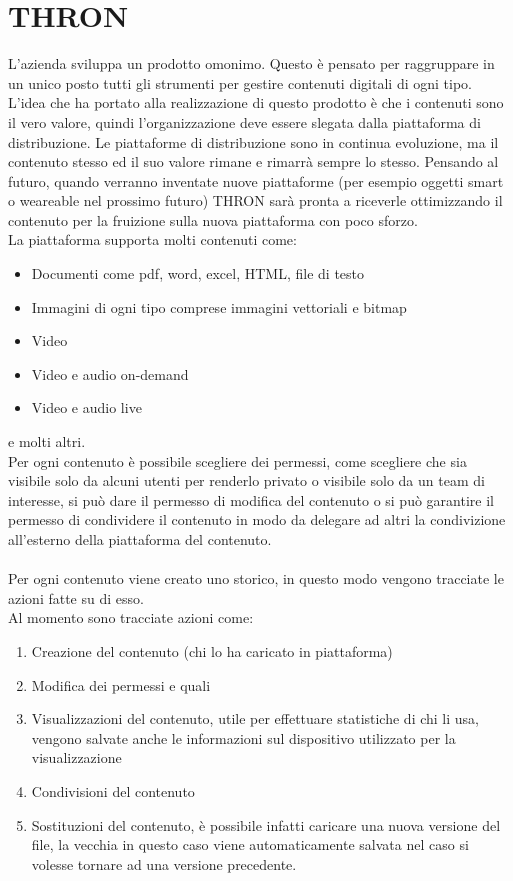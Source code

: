 \documentclass[a4paper, 12pt, twoside, openright]{book}
\begin{document}
\newpage{}
\section{THRON}
L'azienda sviluppa un prodotto omonimo. Questo è pensato per raggruppare in un unico posto tutti gli strumenti per gestire contenuti digitali di ogni tipo.\\
L'idea che ha portato alla realizzazione di questo prodotto è che i contenuti sono il vero valore, quindi l'organizzazione deve essere slegata dalla piattaforma di distribuzione. Le piattaforme di distribuzione sono in continua evoluzione, ma il contenuto stesso ed il suo valore rimane e rimarrà sempre lo stesso. Pensando al futuro, quando verranno inventate nuove piattaforme (per esempio oggetti smart o weareable nel prossimo futuro) THRON sarà pronta a riceverle ottimizzando il contenuto per la fruizione sulla nuova piattaforma con poco sforzo.\\
La piattaforma supporta molti contenuti come:
\begin{itemize}
\item Documenti come pdf, word, excel, HTML, file di testo
\item Immagini di ogni tipo comprese immagini vettoriali e bitmap
\item Video
\item Video e audio on-demand
\item Video e audio live
\end{itemize}
e molti altri.\\
Per ogni contenuto è possibile scegliere dei permessi, come scegliere che sia visibile solo da alcuni utenti per renderlo privato o visibile solo da un team di interesse, si può dare il permesso di modifica del contenuto o si può garantire il permesso di condividere il contenuto in modo da delegare ad altri la condivizione all'esterno della piattaforma del contenuto.\\ \\
Per ogni contenuto viene creato uno storico, in questo modo vengono tracciate le azioni fatte su di esso.\\
Al momento sono tracciate azioni come:
\begin{enumerate}
\item Creazione del contenuto (chi lo ha caricato in piattaforma)
\item Modifica dei permessi e quali
\item Visualizzazioni del contenuto, utile per effettuare statistiche di chi li usa, vengono salvate anche le informazioni sul dispositivo utilizzato per la visualizzazione
\item Condivisioni del contenuto
\item Sostituzioni del contenuto, è possibile infatti caricare una nuova versione del file, la vecchia in questo caso viene automaticamente salvata nel caso si volesse tornare ad una versione precedente.
\end{enumerate}
\end{document}
